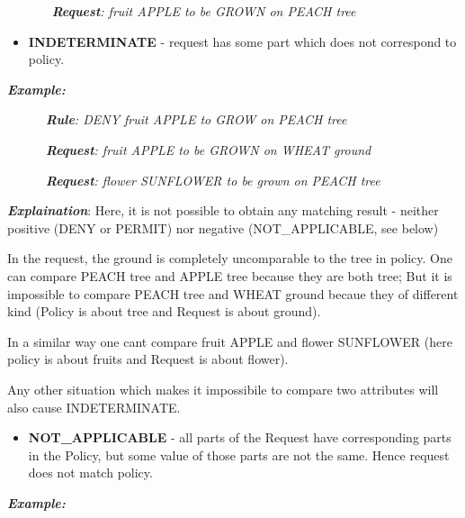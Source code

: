 \documentclass{article}
\newcommand\liststyleWWviiiNumxxi{%
\renewcommand\labelitemi{[F0B7?]}
\renewcommand\labelitemii{o}
\renewcommand\labelitemiii{[F0A7?]}
\renewcommand\labelitemiv{[F0B7?]}
}
\begin{document}
{\upshape\color{black}
\textbf{\textit{\ \ \ \ \ \ }}\textbf{\textit{Request}}\textit{: fruit
APPLE to be GROWN on PEACH tree}}

\liststyleWWviiiNumxxi
\begin{itemize}
\item {\color{black}
\textbf{INDETERMINATE} - request has some part which does not correspond
to policy.}
\end{itemize}
{\bfseries\itshape\color{black}
Example: }

{\upshape\color{black}
\textit{\ \ \ \ \ \ }\textbf{\textit{Rule}}\textit{: DENY fruit APPLE to
GROW on PEACH tree}}

{\upshape\color{black}
\textit{\ \ \ \ \ \ }\textbf{\textit{Request}}\textit{: fruit APPLE to
be GROWN on WHEAT ground}}

{\upshape\color{black}
\textit{\ \ \ \ \ \ }\textbf{\textit{Request}}\textit{: flower SUNFLOWER
to be grown on PEACH tree}}

{\upshape\color{black}
\textbf{\textit{Explaination}}: Here, it is not possible to obtain any
matching result - neither positive (DENY or PERMIT) nor negative
(NOT\_APPLICABLE, see below)}

{\color{black}
In the request, the {\textquotedbl}ground{\textquotedbl} is completely
uncomparable to the {\textquotedbl}tree{\textquotedbl} in policy. One
can compare {\textquotedbl}PEACH tree{\textquotedbl} and
{\textquotedbl}APPLE tree{\textquotedbl} because they are both
{\textquotedbl}tree{\textquotedbl}; But it is impossible to compare
{\textquotedbl}PEACH tree{\textquotedbl} and {\textquotedbl}WHEAT
ground{\textquotedbl} becaue they of different kind (Policy is about
tree and Request is about ground).}

{\color{black}
In a similar way one can{\textquotesingle}t compare {\textquotedbl}fruit
APPLE{\textquotedbl} and {\textquotedbl}flower SUNFLOWER{\textquotedbl}
(here policy is about fruits and Request is about flower).}

{\color{black}
Any other situation which makes it impossibile to compare two attributes
will also cause {\textquotedbl}INDETERMINATE{\textquotedbl}.}


\bigskip

\liststyleWWviiiNumxxi
\begin{itemize}
\item {\color{black}
\textbf{NOT\_APPLICABLE} - all parts of the Request have corresponding
parts in the Policy, but some value of those parts are not the same.
Hence request does not match policy.}
\end{itemize}
{\bfseries\itshape\color{black}
Example:}
\end{document}
